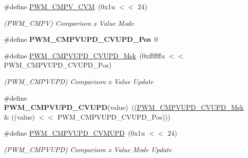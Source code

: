 \begin{DoxyCompactItemize}
\item 
\mbox{\label{group__SAME70__PWM_ga24cfa2d6b73b73550360250af30a5224}} 
\#define \mbox{\hyperlink{group__SAME70__PWM_ga24cfa2d6b73b73550360250af30a5224}{P\+W\+M\+\_\+\+C\+M\+P\+V\+\_\+\+C\+VM}}~(0x1u $<$$<$ 24)
\begin{DoxyCompactList}\small\item\em (P\+W\+M\+\_\+\+C\+M\+PV) Comparison x Value Mode \end{DoxyCompactList}\item 
\mbox{\label{group__SAME70__PWM_ga00d9ce6aa5ce448194cfda50721bd5b0}} 
\#define {\bfseries P\+W\+M\+\_\+\+C\+M\+P\+V\+U\+P\+D\+\_\+\+C\+V\+U\+P\+D\+\_\+\+Pos}~0
\item 
\mbox{\label{group__SAME70__PWM_ga814522233f8137b734c794b115c82d08}} 
\#define \mbox{\hyperlink{group__SAME70__PWM_ga814522233f8137b734c794b115c82d08}{P\+W\+M\+\_\+\+C\+M\+P\+V\+U\+P\+D\+\_\+\+C\+V\+U\+P\+D\+\_\+\+Msk}}~(0xffffffu $<$$<$ P\+W\+M\+\_\+\+C\+M\+P\+V\+U\+P\+D\+\_\+\+C\+V\+U\+P\+D\+\_\+\+Pos)
\begin{DoxyCompactList}\small\item\em (P\+W\+M\+\_\+\+C\+M\+P\+V\+U\+PD) Comparison x Value Update \end{DoxyCompactList}\item 
\mbox{\label{group__SAME70__PWM_ga289a10af1c9e1d2817c5394ca5ab052f}} 
\#define {\bfseries P\+W\+M\+\_\+\+C\+M\+P\+V\+U\+P\+D\+\_\+\+C\+V\+U\+PD}(value)~((\mbox{\hyperlink{group__SAMV71__PWM_ga814522233f8137b734c794b115c82d08}{P\+W\+M\+\_\+\+C\+M\+P\+V\+U\+P\+D\+\_\+\+C\+V\+U\+P\+D\+\_\+\+Msk}} \& ((value) $<$$<$ P\+W\+M\+\_\+\+C\+M\+P\+V\+U\+P\+D\+\_\+\+C\+V\+U\+P\+D\+\_\+\+Pos)))
\item 
\mbox{\label{group__SAME70__PWM_ga588c81afa5376f6abb27ce1dbe05578f}} 
\#define \mbox{\hyperlink{group__SAME70__PWM_ga588c81afa5376f6abb27ce1dbe05578f}{P\+W\+M\+\_\+\+C\+M\+P\+V\+U\+P\+D\+\_\+\+C\+V\+M\+U\+PD}}~(0x1u $<$$<$ 24)
\begin{DoxyCompactList}\small\item\em (P\+W\+M\+\_\+\+C\+M\+P\+V\+U\+PD) Comparison x Value Mode Update \end{DoxyCompactList}\item 

\end{DoxyCompactItemize}
